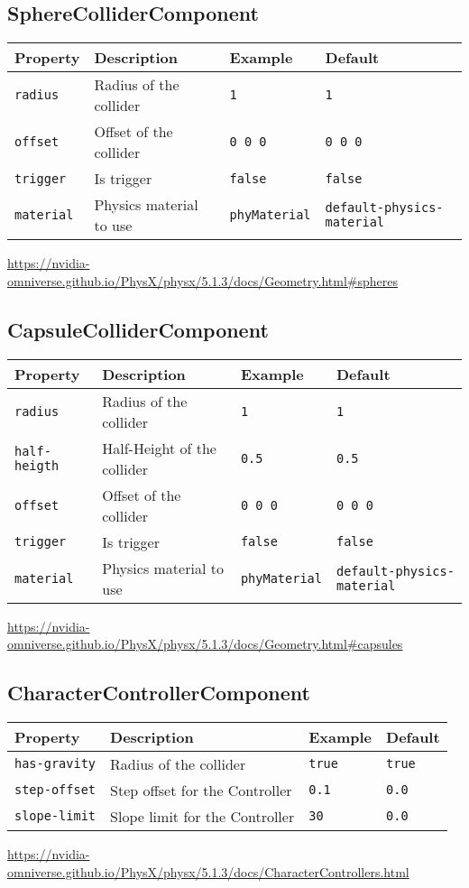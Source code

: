 \subsection{SphereColliderComponent}
\label{comp:SphereColliderComponent}
\begin{tabular}{|l|l|l|l|}
    \hline
    Property & Description & Example & Default \\ \hline
    \verb|radius| & Radius of the collider & \verb|1| & \verb|1| \\ \hline
    \verb|offset| & Offset of the collider & \verb|0 0 0| & \verb|0 0 0| \\ \hline
    \verb|trigger| & Is trigger & \verb|false| & \verb|false| \\ \hline
    \verb|material| & Physics material to use & \verb|phyMaterial| & \verb|default-physics-material| \\ \hline
\end{tabular}

\url{https://nvidia-omniverse.github.io/PhysX/physx/5.1.3/docs/Geometry.html#spheres}


\subsection{CapsuleColliderComponent}
\label{comp:CapsuleColliderComponent}
\begin{tabular}{|l|l|l|l|}
    \hline
    Property & Description & Example & Default \\ \hline
    \verb|radius| & Radius of the collider & \verb|1| & \verb|1| \\ \hline
    \verb|half-heigth| & Half-Height of the collider & \verb|0.5| & \verb|0.5| \\ \hline
    \verb|offset| & Offset of the collider & \verb|0 0 0| & \verb|0 0 0| \\ \hline
    \verb|trigger| & Is trigger & \verb|false| & \verb|false| \\ \hline
    \verb|material| & Physics material to use & \verb|phyMaterial| & \verb|default-physics-material| \\ \hline
\end{tabular}

\url{https://nvidia-omniverse.github.io/PhysX/physx/5.1.3/docs/Geometry.html#capsules}

\subsection{CharacterControllerComponent}
\label{comp:CharacterControllerComponent}
\begin{tabular}{|l|l|l|l|}
    \hline
    Property & Description & Example & Default \\ \hline
    \verb|has-gravity| & Radius of the collider & \verb|true| & \verb|true| \\ \hline
    \verb|step-offset| & Step offset for the Controller & \verb|0.1| & \verb|0.0| \\ \hline
    \verb|slope-limit| & Slope limit for the Controller & \verb|30| & \verb|0.0| \\ \hline
\end{tabular}

\url{https://nvidia-omniverse.github.io/PhysX/physx/5.1.3/docs/CharacterControllers.html}